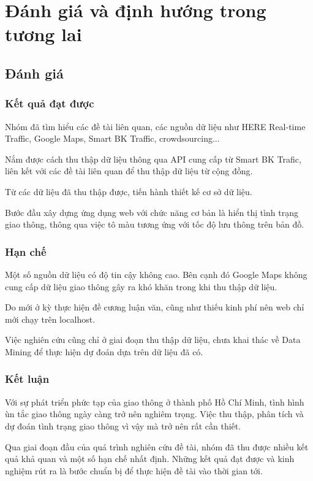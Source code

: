 
\chapter{Đánh giá và định hướng trong tương lai} %

\label{Chapter5}
\section{Đánh giá}
\subsection{Kết quả đạt được}
Nhóm đã tìm hiểu các đề tài liên quan, các nguồn dữ liệu như HERE Real-time Traffic, Google Maps, Smart BK Traffic, crowdsourcing...

Nắm được cách thu thập dữ liệu thông qua API cung cấp từ Smart BK Trafic, liên kết với các đề tài liên quan để thu thập dữ liệu từ cộng đồng.

Từ các dữ liệu đã thu thập được, tiến hành thiết kế cơ sở dữ liệu.

Bước đầu xây dựng ứng dụng web với chức năng cơ bản là hiển thị tình trạng giao thông, thông qua việc tô màu tương ứng với tốc độ lưu thông trên bản đồ.

\subsection{Hạn chế}
Một số nguồn dữ liệu có độ tin cậy không cao. Bên cạnh đó Google Maps không cung cấp dữ liệu giao thông gây ra khó khăn trong khi thu thập dữ liệu.

Do mới ở kỳ thực hiện đề cương luận văn, cũng như thiếu kinh phí nên web chỉ mới chạy trên localhost.

Việc nghiên cứu cũng chỉ ở giai đoạn thu thập dữ liệu, chưa khai thác về Data Mining để thực hiện dự đoán dựa trên dữ liệu đã có.

\subsection{Kết luận}
Với sự phát triển phức tạp của giao thông ở thành phố Hồ Chí Minh, tình hình ùn tắc giao thông ngày càng trở nên nghiêm trọng. Việc thu thập, phân tích và dự đoán tình trạng giao thông vì vậy mà trở nên rất cần thiết.

Qua giai đoạn đầu của quá trình nghiên cứu đề tài, nhóm đã thu được nhiều kết quả khả quan và một số hạn chế nhất định. Những kết quả đạt được và kinh nghiệm rút ra là bước chuẩn bị để thực hiện đề tài vào thời gian tới.

